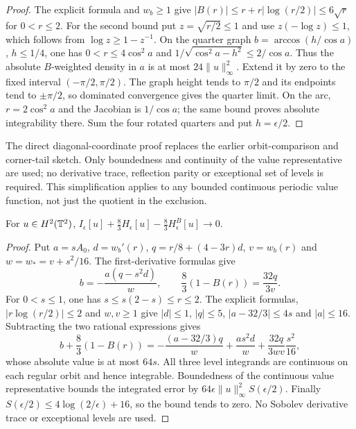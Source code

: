 \begin{proof}
\leanok
The explicit formula and $w_b\ge1$ give
$|B(r)|\le r+r|\log(r/2)|\le6\sqrt r$ for $0<r\le2$.
For the second bound put $z=\sqrt{r/2}\le1$ and use
$z(-\log z)\le1$, which follows from $\log z\ge1-z^{-1}$.
On the quarter graph $b=\arccos(h/\cos a)$, $h\le1/4$, one has
$0<r\le4\cos^2a$ and $1/\sqrt{\cos^2a-h^2}\le2/\cos a$.
Thus the absolute $B$-weighted density in $a$ is at most $24\|u\|_\infty^2$.
Extend it by zero to the fixed interval $(-\pi/2,\pi/2)$.
The graph height tends to $\pi/2$ and its endpoints tend to $\pm\pi/2$,
so dominated convergence gives the quarter limit.
On the arc, $r=2\cos^2a$ and the Jacobian is $1/\cos a$;
the same bound proves absolute integrability there.
Sum the four rotated quarters and put $h=\epsilon/2$.
\end{proof}

\begin{remark}
The direct diagonal-coordinate proof replaces the earlier orbit-comparison
and corner-tail sketch. Only boundedness and continuity of the value
representative are used; no derivative trace, reflection parity or exceptional
set of levels is required. This simplification applies to any bounded
continuous periodic value function, not just the quotient in the exclusion.
\end{remark}

\begin{lemma}
\label{lem:dd-current-remainder-limit}
\leanok
For $u\in H^2(\mathbb{T}^2)$,
$I_\epsilon[u]+\tfrac83H_\epsilon[u]-\tfrac83H^B_\epsilon[u]\to0$.
\end{lemma}

\begin{proof}
\leanok
Put $a=sA_0$, $d=w_b'(r)$, $q=r/8+(4-3r)d$, $v=w_b(r)$ and
$w=w_*=v+s^2/16$. The first-derivative formulas give
\[
 b=-\frac{a(q-s^2d)}w,\qquad
 \frac83(1-B(r))=\frac{32q}{3v}.
\]
For $0<s\le1$, one has $s\le s(2-s)\le r\le2$.
The explicit formulas, $|r\log(r/2)|\le2$ and $w,v\ge1$ give
$|d|\le1$, $|q|\le5$, $|a-32/3|\le4s$ and $|a|\le16$.
Subtracting the two rational expressions gives
\[
 b+\frac83(1-B(r))
 =-\frac{(a-32/3)q}w+\frac{as^2d}w
   +\frac{32q}{3wv}\frac{s^2}{16},
\]
whose absolute value is at most $64s$.
All three level integrands are continuous on each regular orbit and hence
integrable. Boundedness of the continuous value representative bounds the
integrated error by $64\epsilon\|u\|_\infty^2 S(\epsilon/2)$.
Finally $S(\epsilon/2)\le4\log(2/\epsilon)+16$, so the bound tends to zero.
No Sobolev derivative trace or exceptional levels are used.
\end{proof}

